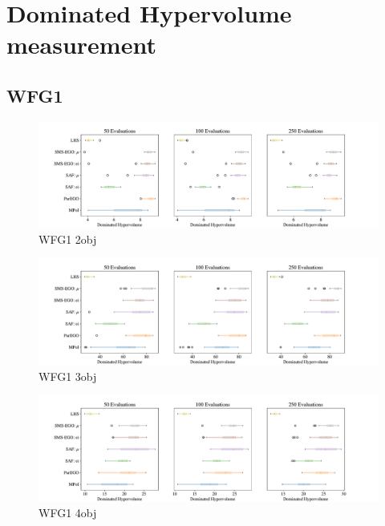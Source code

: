 \documentclass[
dvipsnames, table,   %
format=acmsmall,     %
anonymous=true,      %
authorversion=false, %
]{acmart}
\begin{document}
\section{Dominated Hypervolume measurement}
\subsection{WFG1}
\begin{figure}[h]
    \centering
    \includegraphics[width=\textwidth]{figures/wfg1_2obj_3dim_hv_boxplot.pdf}
    \caption{WFG1 2obj}
    \label{fig:boxplot WFG1_2obj_3dim}
\end{figure}

\begin{figure}[h]
    \centering
    \includegraphics[width=\textwidth]{figures/wfg1_3obj_4dim_hv_boxplot.pdf}
    \caption{WFG1 3obj}
    \label{fig:boxplot WFG1_3obj_4dim}
\end{figure}

\begin{figure}[h]
    \centering
    \includegraphics[width=\textwidth]{figures/wfg1_4obj_5dim_hv_boxplot.pdf}
    \caption{WFG1 4obj}
    \label{fig:boxplot WFG1_4obj_5dim}
\end{figure}
\clearpage
\end{document}
